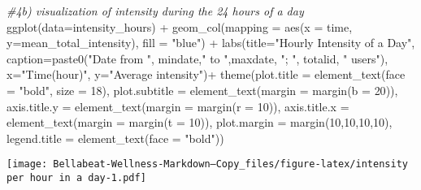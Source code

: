 \documentclass[
]{article}
\newenvironment{Shaded}{\begin{snugshade}}{\end{snugshade}}
\newcommand{\AttributeTok}[1]{\textcolor[rgb]{0.77,0.63,0.00}{#1}}
\newcommand{\CommentTok}[1]{\textcolor[rgb]{0.56,0.35,0.01}{\textit{#1}}}
\newcommand{\DecValTok}[1]{\textcolor[rgb]{0.00,0.00,0.81}{#1}}
\newcommand{\FunctionTok}[1]{\textcolor[rgb]{0.00,0.00,0.00}{#1}}
\newcommand{\NormalTok}[1]{#1}
\newcommand{\SpecialCharTok}[1]{\textcolor[rgb]{0.00,0.00,0.00}{#1}}
\newcommand{\StringTok}[1]{\textcolor[rgb]{0.31,0.60,0.02}{#1}}
\begin{document}
\begin{Shaded}
\begin{Highlighting}[]
\CommentTok{\#4b) visualization of intensity during the 24 hours of a day}
\FunctionTok{ggplot}\NormalTok{(}\AttributeTok{data=}\NormalTok{intensity\_hours) }\SpecialCharTok{+}
  \FunctionTok{geom\_col}\NormalTok{(}\AttributeTok{mapping =} \FunctionTok{aes}\NormalTok{(}\AttributeTok{x =}\NormalTok{ time, }\AttributeTok{y=}\NormalTok{mean\_total\_intensity), }\AttributeTok{fill =} \StringTok{"blue"}\NormalTok{) }\SpecialCharTok{+}
  \FunctionTok{labs}\NormalTok{(}\AttributeTok{title=}\StringTok{"Hourly Intensity of a Day"}\NormalTok{,}
       \AttributeTok{caption=}\FunctionTok{paste0}\NormalTok{(}\StringTok{"Date from "}\NormalTok{, mindate,}\StringTok{" to "}\NormalTok{,maxdate, }\StringTok{";}
\StringTok{                      "}\NormalTok{, totalid, }\StringTok{" users"}\NormalTok{),}
       \AttributeTok{x=}\StringTok{"Time(hour)"}\NormalTok{,}
       \AttributeTok{y=}\StringTok{"Average intensity"}\NormalTok{)}\SpecialCharTok{+}
  \FunctionTok{theme}\NormalTok{(}\AttributeTok{plot.title =} \FunctionTok{element\_text}\NormalTok{(}\AttributeTok{face =} \StringTok{"bold"}\NormalTok{, }\AttributeTok{size =} \DecValTok{18}\NormalTok{),}
        \AttributeTok{plot.subtitle =} \FunctionTok{element\_text}\NormalTok{(}\AttributeTok{margin =} \FunctionTok{margin}\NormalTok{(}\AttributeTok{b =} \DecValTok{20}\NormalTok{)),}
        \AttributeTok{axis.title.y =} \FunctionTok{element\_text}\NormalTok{(}\AttributeTok{margin =} \FunctionTok{margin}\NormalTok{(}\AttributeTok{r =} \DecValTok{10}\NormalTok{)),}
        \AttributeTok{axis.title.x =} \FunctionTok{element\_text}\NormalTok{(}\AttributeTok{margin =} \FunctionTok{margin}\NormalTok{(}\AttributeTok{t =} \DecValTok{10}\NormalTok{)),}
        \AttributeTok{plot.margin =} \FunctionTok{margin}\NormalTok{(}\DecValTok{10}\NormalTok{,}\DecValTok{10}\NormalTok{,}\DecValTok{10}\NormalTok{,}\DecValTok{10}\NormalTok{),}
        \AttributeTok{legend.title =} \FunctionTok{element\_text}\NormalTok{(}\AttributeTok{face =} \StringTok{"bold"}\NormalTok{))}
\end{Highlighting}
\end{Shaded}

\texttt{[image: Bellabeat-Wellness-Markdown---Copy\_files/figure-latex/intensity per hour in a day-1.pdf]}
\end{document}
